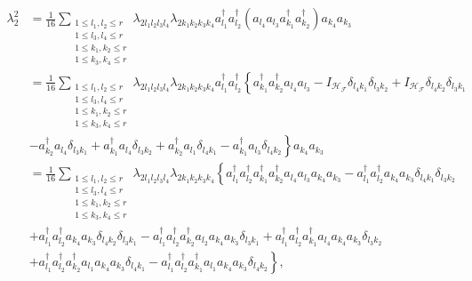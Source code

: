 \documentclass[aps,preprint]{revtex4}%
\begin{document}
\begin{align}
\lambda_{2}^{2}  &  =\frac{1}{16}\sum_{\substack{1\leq l_{1},l_{2}\leq
r\\1\leq l_{3},l_{4}\leq r\\1\leq k_{1},k_{2}\leq r\\1\leq k_{3},k_{4}\leq
r}}\lambda_{2l_{1}l_{2}l_{3}l_{4}}\lambda_{2k_{1}k_{2}k_{3}k_{4}}a_{l_{1}%
}^{\dagger}a_{l_{2}}^{\dagger}\left(  a_{l_{4}}a_{l_{3}}a_{k_{1}}^{\dagger
}a_{k_{2}}^{\dagger}\right)  a_{k_{4}}a_{k_{3}}\nonumber\\
&  =\frac{1}{16}\sum_{\substack{1\leq l_{1},l_{2}\leq r\\1\leq l_{3},l_{4}\leq
r\\1\leq k_{1},k_{2}\leq r\\1\leq k_{3},k_{4}\leq r}}\lambda_{2l_{1}l_{2}%
l_{3}l_{4}}\lambda_{2k_{1}k_{2}k_{3}k_{4}}a_{l_{1}}^{\dagger}a_{l_{2}%
}^{\dagger}\left\{  a_{k_{1}}^{\dagger}a_{k_{2}}^{\dagger}a_{l_{4}}a_{l_{3}%
}-I_{\mathcal{H}_{\mathcal{F}}}\delta_{l_{4}k_{1}}\delta_{l_{3}k_{2}%
}+I_{\mathcal{H}_{\mathcal{F}}}\delta_{l_{4}k_{2}}\delta_{l_{3}k_{1}}\right.
\nonumber\\
&  \left.  -a_{k_{2}}^{\dagger}a_{l_{4}}\delta_{l_{3}k_{1}}+a_{k_{1}}%
^{\dagger}a_{l_{4}}\delta_{l_{3}k_{2}}+a_{k_{2}}^{\dagger}a_{l_{1}}%
\delta_{l_{4}k_{1}}-a_{k_{1}}^{\dagger}a_{l_{3}}\delta_{l_{4}k_{2}}\right\}
a_{k_{4}}a_{k_{3}}\nonumber\\
&  =\frac{1}{16}\sum_{\substack{1\leq l_{1},l_{2}\leq r\\1\leq l_{3},l_{4}\leq
r\\1\leq k_{1},k_{2}\leq r\\1\leq k_{3},k_{4}\leq r}}\lambda_{2l_{1}l_{2}%
l_{3}l_{4}}\lambda_{2k_{1}k_{2}k_{3}k_{4}}\left\{  a_{l_{1}}^{\dagger}%
a_{l_{2}}^{\dagger}a_{k_{1}}^{\dagger}a_{k_{2}}^{\dagger}a_{l_{4}}a_{l_{3}%
}a_{k_{4}}a_{k_{3}}-a_{l_{1}}^{\dagger}a_{l_{2}}^{\dagger}a_{k_{4}}a_{k_{3}%
}\delta_{l_{4}k_{1}}\delta_{l_{3}k_{2}}\right. \nonumber\\
&  +a_{l_{1}}^{\dagger}a_{l_{2}}^{\dagger}a_{k_{4}}a_{k_{3}}\delta_{l_{4}%
k_{2}}\delta_{l_{3}k_{1}}-a_{l_{1}}^{\dagger}a_{l_{2}}^{\dagger}a_{k_{2}%
}^{\dagger}a_{l_{2}}a_{k_{4}}a_{k_{3}}\delta_{l_{3}k_{1}}+a_{l_{1}}^{\dagger
}a_{l_{2}}^{\dagger}a_{k_{1}}^{\dagger}a_{l_{4}}a_{k_{4}}a_{k_{3}}%
\delta_{l_{3}k_{2}}\nonumber\\
&  \left.  +a_{l_{1}}^{\dagger}a_{l_{2}}^{\dagger}a_{k_{2}}^{\dagger}a_{l_{1}%
}a_{k_{4}}a_{k_{3}}\delta_{l_{4}k_{1}}-a_{l_{1}}^{\dagger}a_{l_{2}}^{\dagger
}a_{k_{1}}^{\dagger}a_{l_{1}}a_{k_{4}}a_{k_{3}}\delta_{l_{4}k_{2}}\right\}  ,
\end{align}
\end{document}
